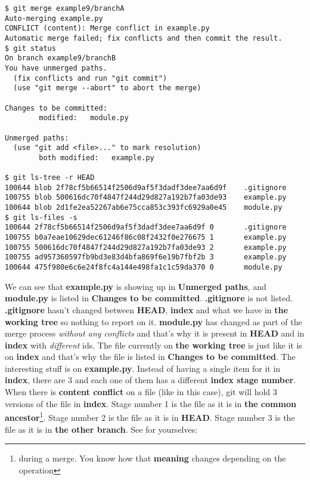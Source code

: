 \begin{lstlisting}[style=console_style,
	basicstyle=\small,
	caption=Merging]
$ git merge example9/branchA
Auto-merging example.py
CONFLICT (content): Merge conflict in example.py
Automatic merge failed; fix conflicts and then commit the result.
$ git status
On branch example9/branchB
You have unmerged paths.
  (fix conflicts and run "git commit")
  (use "git merge --abort" to abort the merge)

Changes to be committed:
        modified:   module.py

Unmerged paths:
  (use "git add <file>..." to mark resolution)
        both modified:   example.py

$ git ls-tree -r HEAD
100644 blob 2f78cf5b66514f2506d9af5f3dadf3dee7aa6d9f    .gitignore
100755 blob 500616dc70f4847f244d29d827a192b7fa03de93    example.py
100644 blob 2d1fe2ea52267ab6e75cca853c393fc6929a0e45    module.py
$ git ls-files -s
100644 2f78cf5b66514f2506d9af5f3dadf3dee7aa6d9f 0       .gitignore
100755 b0a7eae10629dec61246f86c08f2432f0e276675 1       example.py
100755 500616dc70f4847f244d29d827a192b7fa03de93 2       example.py
100755 ad957360597fb9bd3e83d4bfa869f6e19b7fbf2b 3       example.py
100644 475f980e6c6e24f8fc4a144e498fa1c1c59da370 0       module.py
\end{lstlisting}

We can see that {\bf example.py} is showing up in {\bf Unmerged paths}, and {\bf module.py} is listed in {\bf Changes to be committed}.
{\bf .gitignore} is not listed. {\bf .gitignore} hasn't changed between {\bf HEAD}, {\bf index} and what we have in {\bf the working tree}
so nothing to report on it. {\bf module.py} has changed as part of the merge process {\it without any conflicts} and that's why it is present
in {\bf HEAD} and in {\bf index} with {\it different} ids. The file currently on {\bf the working tree} is just like it is on {\bf index}
and that's why the file is listed in {\bf Changes to be committed}. The interesting stuff is on {\bf example.py}. Instead of having
a single item for it in {\bf index}, there are 3 and each one of them has a different {\bf index stage number}. When there is {\bf content
conflict} on a file (like in this case), git will hold 3 versions of the file in {\bf index}. Stage number 1 is the file as it is in
{\bf the common ancestor}\footnote{during a merge. You know how that {\bf meaning} changes depending on the operation}.
Stage number 2 is the file as it is in {\bf HEAD}. Stage number 3 is the file as it is in {\bf the other branch}. See for yourselves:

